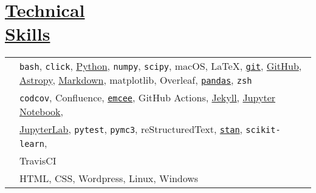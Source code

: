 \documentclass[margin]{res}
\begin{document}
\begin{resume}
\begin{tabular}{l p{4.3in}}
\end{tabular}







\section{\href{https://github.com/benjaminrose}{Technical \\Skills}}

\hspace{1pt}
\begin{tabular}{l p{4.5in}}

\hspace{-1em}{\bf Daily Use:} & 
\texttt{bash},
\texttt{click},
\href{https://www.python.org}{Python},
\texttt{numpy},
\texttt{scipy},
macOS,
\LaTeX,
\href{https://git-scm.com}{\texttt{git}},
\href{https://github.com/benjaminrose}{GitHub},
\href{http://www.astropy.org}{Astropy},
\href{http://daringfireball.net/projects/markdown/}{Markdown},
matplotlib,
Overleaf,
\href{http://pandas.pydata.org}{\texttt{pandas}},
\texttt{zsh}
\\

\hspace{-1em}{\bf Proficient:} & 
\texttt{codcov},
Confluence,
\href{http://dan.iel.fm/emcee/current/}{\texttt{emcee}},
GitHub Actions,
\href{https://jekyllrb.com}{Jekyll},
\href{http://jupyter.org}{Jupyter Notebook},
\\&
\href{https://jupyterlab.readthedocs.io/en/stable/}{JupyterLab},
\texttt{pytest},
\texttt{pymc3},
reStructuredText,
\href{http://mc-stan.org}{\texttt{stan}},
\texttt{scikit-learn},
\\&
TravisCI\vspace{0.3em}
\\

\hspace{-1em}{\bf Competent:} & HTML,
CSS,
Wordpress,
Linux,
Windows %
\end{tabular}







\end{resume}
\end{document}
